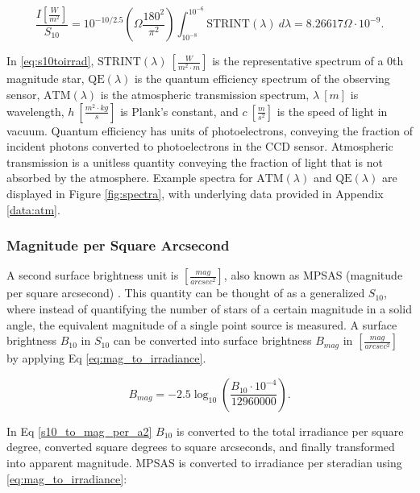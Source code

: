 \begin{equation} \label{eq:s10toirrad}
 \frac{I \left[ \frac{W}{m^2} \right]}{S_{10}} = 10^{-10/2.5} \left( \Omega \frac{180^2}{\pi^2} \right)
  \int_{10^{-8}}^{10^{-6}}{ \textrm{STRINT}(\lambda) \: d\lambda} = 8.26617 \Omega \cdot 10^{-9}.
\end{equation}

In \ref{eq:s10toirrad}, $\textrm{STRINT}(\lambda) \: \left[ \frac{W}{m^2 \cdot m} \right]$ is the
representative spectrum of a 0th magnitude star, $\textrm{QE}(\lambda)$ is the quantum efficiency
spectrum of the observing sensor, $\textrm{ATM}(\lambda)$ is the atmospheric transmission spectrum, $\lambda \: [m]$ is wavelength, $h \: \left[
\frac{m^2 \cdot kg}{s} \right]$ is Plank's constant, and $c \: \left[ \frac{m}{s^2} \right]$ is the
speed of light in vacuum. Quantum efficiency has units of photoelectrons, conveying the fraction of incident photons converted to photoelectrons in the CCD sensor. Atmospheric transmission is a unitless quantity conveying the fraction of light that is not absorbed by the atmosphere. Example spectra for $\textrm{ATM}(\lambda)$ and $\textrm{QE}(\lambda)$ are displayed in Figure \ref{fig:spectra}, with underlying data provided in Appendix \ref{data:atm}.

\subsubsection{Magnitude per Square Arcsecond}

A second surface brightness unit is $\left[ \frac{mag}{arcsec^2} \right]$, also known as MPSAS (magnitude per square arcsecond) \cite{krag2003}. This quantity can be thought of as a generalized $S_{10}$, where instead of quantifying the number of stars of a certain
magnitude in a solid angle, the equivalent magnitude of a single point source is measured. A surface
brightness $B_{10}$ in $S_{10}$ can be converted into surface brightness $B_{mag}$ in 
$\left[ \frac{mag}{arcsec^2} \right]$ by applying Eq \ref{eq:mag_to_irradiance}.

\begin{equation} \label{s10_to_mag_per_a2}
	B_{mag} = -2.5 \log_{10}\left( \frac{B_{10} \cdot 10^{-4}}{12960000} \right).
\end{equation}

In Eq \ref{s10_to_mag_per_a2} $B_{10}$ is converted to the total irradiance per square degree,
converted square degrees to square arcseconds, and finally transformed into apparent magnitude. MPSAS is converted to irradiance per steradian using \ref{eq:mag_to_irradiance}:

